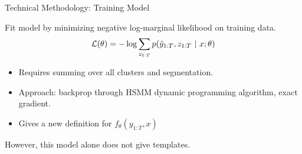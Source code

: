 \begin{frame}{Technical Methodology:  Training Model}


  Fit model by minimizing  negative log-marginal likelihood on training data.
    \[ {\cal L}(\theta) =  - \log \sum_{z_{1:T}} p(\hat{y}_{1:T}, z_{1:T} \ |\ x; \theta)\]


    \begin{itemize}
    \item Requires summing over all clusters and segmentation.
    \item Approach: backprop through HSMM dynamic programming algorithm, exact gradient.
    \item Gives a new definition for $f_\theta(y_{1:T}, x)$
    \end{itemize}

    However, this model alone does not give templates.
    \air
\end{frame}


